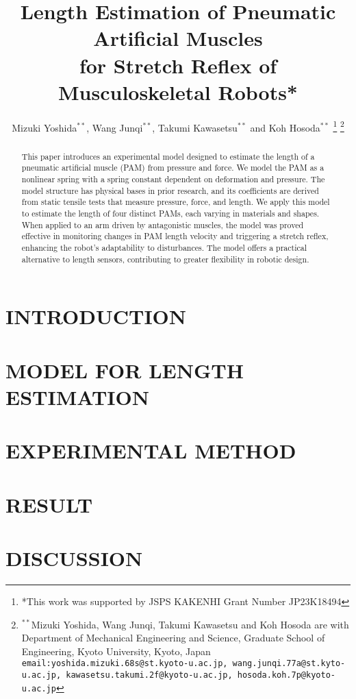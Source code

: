\documentclass[letterpaper, 10 pt, conference]{IEEEconf}
\title{\LARGE \bf
Length Estimation of Pneumatic Artificial Muscles \\for Stretch Reflex of Musculoskeletal Robots*}
\author{Mizuki Yoshida$^{**}$, Wang Junqi$^{**}$, Takumi Kawasetsu$^{**}$ and Koh Hosoda$^{**}$%
\thanks{*This work was supported by JSPS KAKENHI Grant Number JP23K18494}%
\thanks{$^{**}$Mizuki Yoshida, Wang Junqi, Takumi Kawasetsu and Koh Hosoda are with Department of Mechanical Engineering and Science, Graduate School of Engineering, Kyoto University, Kyoto, Japan
{\tt\small email:yoshida.mizuki.68s@st.kyoto-u.ac.jp, wang.junqi.77a@st.kyto-u.ac.jp, kawasetsu.takumi.2f@kyoto-u.ac.jp, hosoda.koh.7p@kyoto-u.ac.jp}
 }
}
\begin{document}
\maketitle
\thispagestyle{empty}
\pagestyle{empty}


\begin{abstract}
This paper introduces an experimental model designed to estimate the length of a pneumatic artificial muscle (PAM) from pressure and force. We model the PAM as a nonlinear spring with a spring constant dependent on deformation and pressure. The model structure has physical bases in prior research, and its coefficients are derived from  static tensile tests that measure pressure, force, and length. We apply this model to estimate the length of four distinct PAMs, each varying in materials and shapes. When applied to an arm driven by antagonistic muscles, the model was proved effective in monitoring changes in PAM length velocity and triggering a stretch reflex, enhancing the robot's adaptability to disturbances.  The model offers a practical alternative to length sensors, contributing to greater flexibility in robotic design.
\end{abstract}




\section{INTRODUCTION}


\section{MODEL FOR LENGTH ESTIMATION}


\section{EXPERIMENTAL METHOD}


\section{RESULT}


\section{DISCUSSION}

\end{document}
